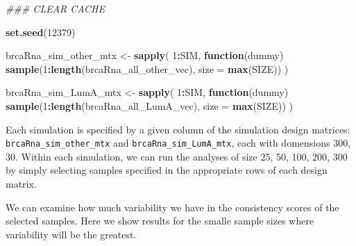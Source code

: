 \documentclass[
]{book}
\newenvironment{Shaded}{\begin{snugshade}}{\end{snugshade}}
\newcommand{\CommentTok}[1]{\textcolor[rgb]{0.56,0.35,0.01}{\textit{#1}}}
\newcommand{\ControlFlowTok}[1]{\textcolor[rgb]{0.13,0.29,0.53}{\textbf{#1}}}
\newcommand{\DataTypeTok}[1]{\textcolor[rgb]{0.13,0.29,0.53}{#1}}
\newcommand{\DecValTok}[1]{\textcolor[rgb]{0.00,0.00,0.81}{#1}}
\newcommand{\KeywordTok}[1]{\textcolor[rgb]{0.13,0.29,0.53}{\textbf{#1}}}
\newcommand{\NormalTok}[1]{#1}
\newcommand{\OperatorTok}[1]{\textcolor[rgb]{0.81,0.36,0.00}{\textbf{#1}}}
\newcommand{\StringTok}[1]{\textcolor[rgb]{0.31,0.60,0.02}{#1}}
\begin{document}
\begin{Shaded}
\begin{Highlighting}[]
\CommentTok{\#\#\# CLEAR CACHE}

\KeywordTok{set.seed}\NormalTok{(}\DecValTok{12379}\NormalTok{)}

\NormalTok{brcaRna\_sim\_other\_mtx <{-}}\StringTok{ }\KeywordTok{sapply}\NormalTok{(}
 \DecValTok{1}\OperatorTok{:}\NormalTok{SIM, }
 \ControlFlowTok{function}\NormalTok{(dummy) }
   \KeywordTok{sample}\NormalTok{(}\DecValTok{1}\OperatorTok{:}\KeywordTok{length}\NormalTok{(brcaRna\_all\_other\_vec), }\DataTypeTok{size =}  \KeywordTok{max}\NormalTok{(SIZE))}
\NormalTok{)}


\NormalTok{brcaRna\_sim\_LumA\_mtx <{-}}\StringTok{ }\KeywordTok{sapply}\NormalTok{(}
 \DecValTok{1}\OperatorTok{:}\NormalTok{SIM, }
 \ControlFlowTok{function}\NormalTok{(dummy) }
   \KeywordTok{sample}\NormalTok{(}\DecValTok{1}\OperatorTok{:}\KeywordTok{length}\NormalTok{(brcaRna\_all\_LumA\_vec), }\DataTypeTok{size =}  \KeywordTok{max}\NormalTok{(SIZE))}
\NormalTok{)}
\end{Highlighting}
\end{Shaded}

Each simulation is specified by a given column of the simulation design matrices:
\texttt{brcaRna\_sim\_other\_mtx} and \texttt{brcaRna\_sim\_LumA\_mtx}, each with domensions 300, 30.
Within each simulation, we can run the analyses of size 25, 50, 100, 200, 300 by simply selecting
samples specified in the appropriate rows of each design matrix.

We can examine how much variability we have in the consistency scores of the selected samples.
Here we show results for the smalle sample sizes where variability will be the greatest.
\end{document}
